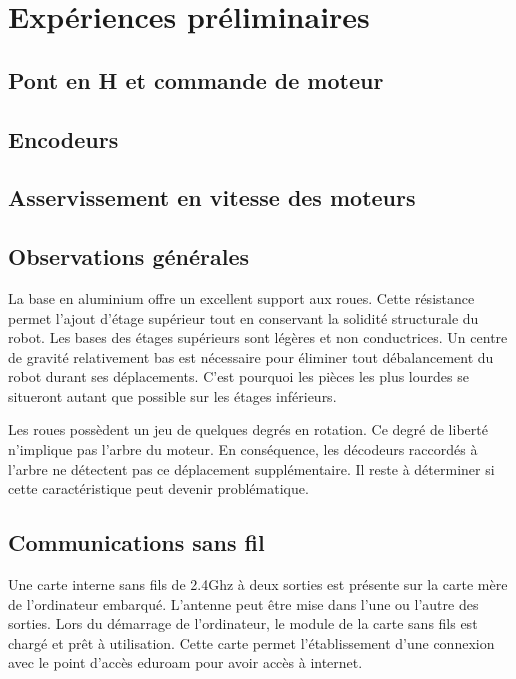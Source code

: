 
\chapter{Expériences préliminaires}

\section{Pont en H et commande de moteur}

\section{Encodeurs}

\section{Asservissement en vitesse des moteurs}

\section{Observations générales}
  La base en aluminium offre un excellent support aux roues. Cette résistance permet l’ajout d’étage supérieur tout en conservant la solidité structurale du robot. Les bases des étages supérieurs sont légères et non conductrices. Un centre de gravité relativement bas est nécessaire pour éliminer tout débalancement du robot durant ses déplacements. C’est pourquoi les pièces les plus lourdes se situeront autant que possible sur les étages inférieurs.

Les roues possèdent un jeu de quelques degrés en rotation. Ce degré de liberté n’implique pas l’arbre du moteur. En conséquence, les décodeurs raccordés à l’arbre ne détectent pas ce déplacement supplémentaire. Il reste à déterminer si cette caractéristique peut devenir problématique. 


\section{Communications sans fil}
 Une carte interne sans fils de 2.4Ghz à deux sorties est présente sur la carte mère de l’ordinateur embarqué. L’antenne peut être mise dans l’une ou l’autre des sorties. Lors du démarrage de l’ordinateur, le module de la carte sans fils est chargé et prêt à utilisation. Cette carte permet l’établissement d’une connexion avec le point d’accès eduroam pour avoir accès à internet. 
 
